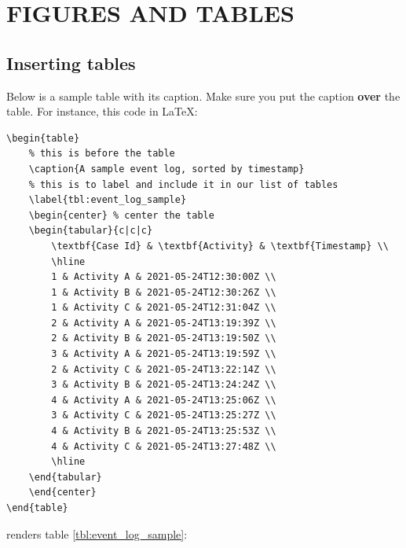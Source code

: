 \documentclass[en,inscr,ack,preface]{dimscthesis}
\begin{document}
\chapter{FIGURES AND TABLES} \label{figures_and_tables}

\section{Inserting tables} \label{inserting_tables}

Below is a sample table with its caption.
Make sure you put the caption \textbf{over} the table.
For instance, this code in \LaTeX{}:

\begin{verbatim}
\begin{table}
    % this is before the table
    \caption{A sample event log, sorted by timestamp}
    % this is to label and include it in our list of tables
    \label{tbl:event_log_sample}
    \begin{center} % center the table
    \begin{tabular}{c|c|c}
        \textbf{Case Id} & \textbf{Activity} & \textbf{Timestamp} \\
        \hline
        1 & Activity A & 2021-05-24T12:30:00Z \\
        1 & Activity B & 2021-05-24T12:30:26Z \\
        1 & Activity C & 2021-05-24T12:31:04Z \\
        2 & Activity A & 2021-05-24T13:19:39Z \\
        2 & Activity B & 2021-05-24T13:19:50Z \\
        3 & Activity A & 2021-05-24T13:19:59Z \\
        2 & Activity C & 2021-05-24T13:22:14Z \\
        3 & Activity B & 2021-05-24T13:24:24Z \\
        4 & Activity A & 2021-05-24T13:25:06Z \\
        3 & Activity C & 2021-05-24T13:25:27Z \\
        4 & Activity B & 2021-05-24T13:25:53Z \\
        4 & Activity C & 2021-05-24T13:27:48Z \\
        \hline
    \end{tabular}
    \end{center}
\end{table}
\end{verbatim}

renders table \ref{tbl:event_log_sample}:
\end{document}
